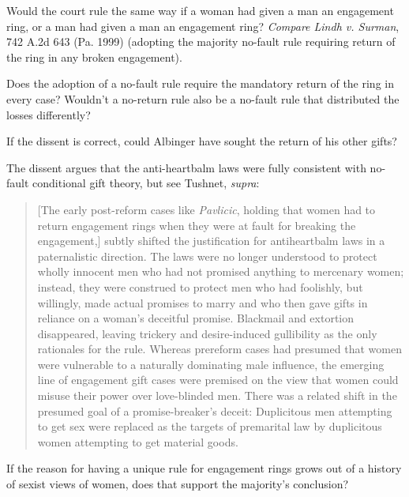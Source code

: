 \item Would the court rule the same way if a woman had given a man an engagement
ring, or a man had given a man an engagement ring? \emph{Compare Lindh v.
Surman}, 742
A.2d 643 (Pa. 1999) (adopting the majority no-fault rule requiring return of
the ring in any broken engagement).  


\item Does the adoption of a no-fault rule require the mandatory return of the
ring in every case? Wouldn't a no-return rule also be a no-fault rule that
distributed the losses differently?  


\item If the dissent is correct, could Albinger have sought the return of his
other gifts? 


\item The dissent argues that the anti-heartbalm laws were fully consistent with
no-fault conditional gift theory, but see Tushnet, \textit{supra}:
\begin{quote}
[The early post-reform cases like \textit{Pavlicic}, holding that women had to
return engagement rings when they were at fault for breaking the engagement,]
subtly shifted the justification for antiheartbalm laws in a paternalistic
direction. The laws were no longer understood to protect wholly innocent men
who had not promised anything to mercenary women; instead, they were construed
to protect men who had foolishly, but willingly, made actual promises to marry
and who then gave gifts in reliance on a woman's deceitful promise. Blackmail
and extortion disappeared, leaving trickery and desire-induced gullibility as
the only rationales for the rule. Whereas prereform cases had presumed that
women were vulnerable to a naturally dominating male influence, the emerging
line of engagement gift cases were premised on the view that women could misuse
their power over love-blinded men. There was a related shift in the presumed
goal of a promise-breaker's deceit: Duplicitous men attempting to get sex were
replaced as the targets of premarital law by duplicitous women attempting to
get material goods.
\end{quote}
If the reason for having a unique rule for engagement rings grows out of a
history of sexist views of women, does that support the majority's conclusion?



